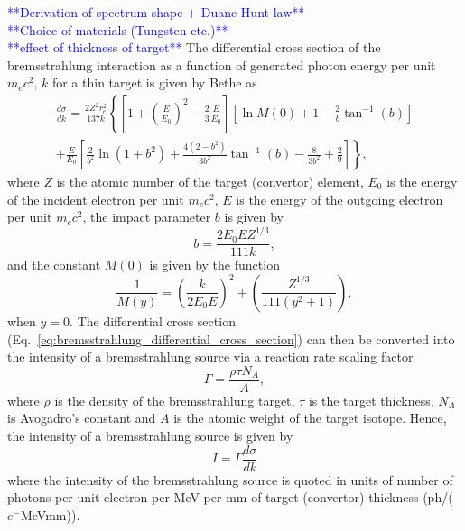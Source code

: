 \documentclass[../main.tex]{subfiles}
\begin{document}
\textcolor{blue}{**Derivation of spectrum shape + Duane-Hunt law** \\ **Choice of materials (Tungsten etc.)** \\ **effect of thickness of target**}
The differential cross section of the bremsstrahlung interaction as a function of generated photon energy per unit $m_{e}c^{2}$, $k$ for a thin target is given by Bethe \cite{bethe1934influence,koch1959bremsstrahlung} as 
\begin{multline}
\frac{d\sigma}{dk} = \frac{2Z^{2}r_{e}^{2}}{137k}\left\{\left[1+\left(\frac{E}{E_{0}}\right)^{2}-\frac{2}{3}\frac{E}{E_{0}}\right]\left[\ln{M\left(0\right)}+1-\frac{2}{b}\tan^{-1}\left(b\right) \right] \right.\\\left. +\frac{E}{E_{0}}\left[\frac{2}{b^{2}}\ln\left(1+b^{2}\right)+\frac{4\left(2-b^{2}\right)}{3b^{2}}\tan^{-1}\left(b\right)-\frac{8}{3b^{2}}+\frac{2}{9}\right]\right\},
\label{eq:bremsstrahlung_differential_cross_section}
\end{multline}
where $Z$ is the atomic number of the target (convertor) element, $E_{0}$ is the energy of the incident electron per unit $m_{e}c^{2}$, $E$ is the energy of the outgoing electron per unit $m_{e}c^{2}$, the impact parameter $b$ is given by 
\begin{equation}
b = \frac{2E_{0}EZ^{1/3}}{111k},
\label{eq:b_impact_parameter}    
\end{equation}
and the constant $M\left(0\right)$ \cite{schiff1951energy} is given by the function
\begin{equation}
\frac{1}{M\left(y\right)} = \left(\frac{k}{2E_{0}E}\right)^{2}+\left(\frac{Z^{1/3}}{111\left(y^{2}+1\right)}\right),
\label{eq:M0_Schiff}    
\end{equation}
when $y=0$. The differential cross section (Eq.~\ref{eq:bremsstrahlung_differential_cross_section}) can then be converted into the intensity of a bremsstrahlung source via a reaction rate scaling factor
\begin{equation}
\Gamma = \frac{\rho\tau N_{A}}{A},
\label{eq:bremsstrahlung_reaction_rate}    
\end{equation}
where $\rho$ is the density of the bremsstrahlung target, $\tau$ is the target thickness, $N_{A}$ is Avogadro's constant and $A$ is the atomic weight of the target isotope. Hence, the intensity of a bremsstrahlung source is given by
\begin{equation}
I = \Gamma\frac{d\sigma}{dk}
\label{eq:bremsstrahlung_intensity}    
\end{equation}
where the intensity of the bremsstrahlung source is quoted in units of number of photons per unit electron per \si{\mega\electronvolt} per \si{\milli\meter} of target (convertor) thickness (ph/($e^{-}$\si{\mega\electronvolt}\si{\milli\meter})).
\end{document}
